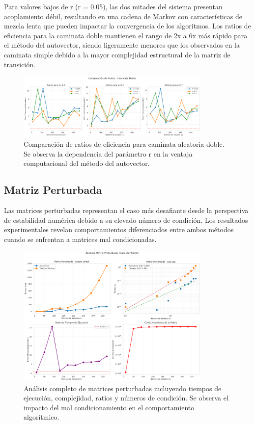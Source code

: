 Para valores bajos de r (r = 0.05), las dos mitades del sistema presentan acoplamiento débil, resultando en una cadena de Markov con características de mezcla lenta que pueden impactar la convergencia de los algoritmos. Los ratios de eficiencia para la caminata doble mantienen el rango de 2x a 6x más rápido para el método del autovector, siendo ligeramente menores que los observados en la caminata simple debido a la mayor complejidad estructural de la matriz de transición.

\begin{figure}[h]
\centering
\includegraphics[width=0.85\textwidth]{../images/caminata_doble_ratios.png}
\caption{Comparación de ratios de eficiencia para caminata aleatoria doble. Se observa la dependencia del parámetro r en la ventaja computacional del método del autovector.}
\label{fig:caminata_doble_ratios}
\end{figure}

\subsection{Matriz Perturbada}

Las matrices perturbadas representan el caso más desafiante desde la perspectiva de estabilidad numérica debido a su elevado número de condición. Los resultados experimentales revelan comportamientos diferenciados entre ambos métodos cuando se enfrentan a matrices mal condicionadas.

\begin{figure}[h]
\centering
\includegraphics[width=0.85\textwidth]{../images/matriz_perturbada_analisis.png}
\caption{Análisis completo de matrices perturbadas incluyendo tiempos de ejecución, complejidad, ratios y números de condición. Se observa el impacto del mal condicionamiento en el comportamiento algorítmico.}
\label{fig:matriz_perturbada}
\end{figure}

